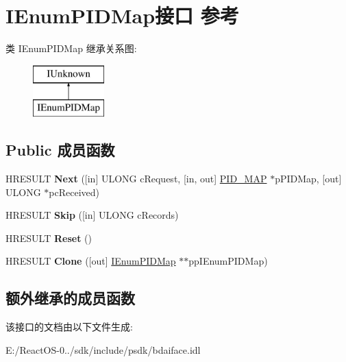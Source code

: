 \hypertarget{interface_i_enum_p_i_d_map}{}\section{I\+Enum\+P\+I\+D\+Map接口 参考}
\label{interface_i_enum_p_i_d_map}
类 I\+Enum\+P\+I\+D\+Map 继承关系图\+:\begin{figure}[H]
\begin{center}
\leavevmode
\includegraphics[height=2.000000cm]{interface_i_enum_p_i_d_map}
\end{center}
\end{figure}
\subsection*{Public 成员函数}
\begin{DoxyCompactItemize}
\item 
\mbox{\label{interface_i_enum_p_i_d_map_aaa2570071d4caafd737235da5573843e}} 
H\+R\+E\+S\+U\+LT {\bfseries Next} (\mbox{[}in\mbox{]} U\+L\+O\+NG c\+Request, \mbox{[}in, out\mbox{]} \hyperlink{struct_p_i_d___m_a_p}{P\+I\+D\+\_\+\+M\+AP} $\ast$p\+P\+I\+D\+Map, \mbox{[}out\mbox{]} U\+L\+O\+NG $\ast$pc\+Received)
\item 
\mbox{\label{interface_i_enum_p_i_d_map_a60240579c3434b8026683ae5442d82d9}} 
H\+R\+E\+S\+U\+LT {\bfseries Skip} (\mbox{[}in\mbox{]} U\+L\+O\+NG c\+Records)
\item 
\mbox{\label{interface_i_enum_p_i_d_map_ad9062f40046e9259bfe59b788923faf3}} 
H\+R\+E\+S\+U\+LT {\bfseries Reset} ()
\item 
\mbox{\label{interface_i_enum_p_i_d_map_a31f1b01e8007e55e75849a427c35adef}} 
H\+R\+E\+S\+U\+LT {\bfseries Clone} (\mbox{[}out\mbox{]} \hyperlink{interface_i_enum_p_i_d_map}{I\+Enum\+P\+I\+D\+Map} $\ast$$\ast$pp\+I\+Enum\+P\+I\+D\+Map)
\end{DoxyCompactItemize}
\subsection*{额外继承的成员函数}


该接口的文档由以下文件生成\+:\begin{DoxyCompactItemize}
\item 
E\+:/\+React\+O\+S-\/0../sdk/include/psdk/bdaiface.\+idl\end{DoxyCompactItemize}
